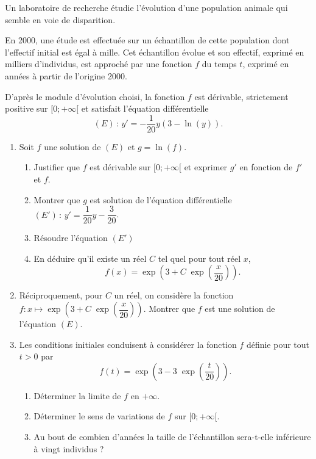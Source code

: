 \documentclass[11pt,fleqn, openany]{book} %
\begin{document}
\begin{exercise}[topic=diff04, subtitle={(Modèle de Gompertz)}]Un laboratoire de recherche étudie l'évolution d'une population animale qui semble en voie de disparition.

En 2000, une étude est effectuée sur un échantillon de cette population dont l'effectif initial est égal à mille. Cet échantillon évolue et son effectif, exprimé en milliers d'individus, est approché par une fonction $f$ du temps $t$, exprimé en années à partir de l'origine 2000.

D'après le module d'évolution choisi, la fonction $f$ est dérivable, strictement positive sur $[0;+\infty[$ et satisfait l'équation différentielle
\[(E)\,:\,y'=-\dfrac{1}{20}y(3-\ln(y)).\]

\begin{enumerate}
\item Soit $f$ une solution de $(E)$ et $g=\ln(f)$.
\begin{enumerate}
\item Justifier que $f$ est dérivable sur $[0;+\infty[$ et exprimer $g'$ en fonction de $f'$ et $f$.
\item Montrer que $g$ est solution de l'équation différentielle $(E')\,:\,y'=\dfrac{1}{20}y-\dfrac{3}{20}$.
\item Résoudre l'équation $(E')$
\item En déduire qu'il existe un réel $C$ tel quel pour tout réel $x$, 
\[f(x)=\exp\left(3+C\;\exp\left(\dfrac{x}{20}\right)\right).\]
\end{enumerate}
\item Réciproquement, pour $C$ un réel, on considère la fonction $f:x\mapsto \exp\left(3+C\;\exp\left(\dfrac{x}{20}\right)\right)$. Montrer que $f$ est une solution de l'équation $(E)$.
\item Les conditions initiales conduisent à considérer la fonction $f$ définie pour tout $t>0$ par
\[f(t)= \exp\left(3-3\;\exp\left(\dfrac{t}{20}\right)\right).\]

\begin{enumerate}
\item Déterminer la limite de $f$ en $+\infty$.
\item Déterminer le sens de variations de $f$ sur $[0;+\infty[$.
\item Au bout de combien d'années la taille de l'échantillon sera-t-elle inférieure à vingt individus ?
\end{enumerate}
\end{enumerate}\end{exercise}
\end{document}
